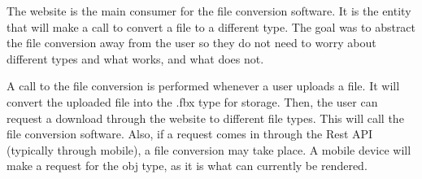         The website is the main consumer for the file conversion software.  It is the entity that will make a call to convert a file to a different type.  The goal was to abstract the file conversion away from the user so they do not need to worry about different types and what works, and what does not.  
            
        A call to the file conversion is performed whenever a user uploads a file.  It will convert the uploaded file into the .fbx type for storage.  Then, the user can request a download through the website to different file types.  This will call the file conversion software.  Also, if a request comes in through the Rest API (typically through mobile), a file conversion may take place.  A mobile device will make a request for the obj type, as it is what can currently be rendered.

